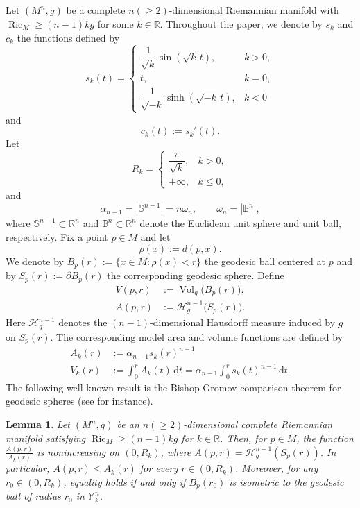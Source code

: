 \documentclass[11pt]{article}
\newtheorem{lemma}[theorem]{Lemma}
\newcommand{\Ric}{\operatorname{Ric}}
\newcommand{\Vol}{\operatorname{Vol}}
\newcommand{\dd}{\,\mathrm{d}}
\newcommand{\Sph}{\mathbb{S}}
\begin{document}
Let $(M^n,g)$ be a complete $n(\geq 2)$-dimensional Riemannian manifold with $\Ric_M\geq (n-1)kg$ for some $k\in\mathbb{R}$. Throughout the paper, we denote by $s_k$  and $c_k$ the functions defined by
\[
s_k(t)
=
\begin{cases}
\dfrac{1}{\sqrt{k}}\sin(\sqrt{k}\,t),
& k>0,\\[1.2ex]
t,
& k=0,\\[1.2ex]
\dfrac{1}{\sqrt{-k}}\sinh(\sqrt{-k}\,t),
& k<0
\end{cases}
\]
and
\[
c_k(t):=s_k'(t).
\]
Let
\[
R_k=
\begin{cases}
\dfrac{\pi}{\sqrt{k}},
& k>0,\\[1ex]
+\infty,
& k\leq0,
\end{cases}
\]
and
\[
\alpha_{n-1}
=
\left|\Sph^{n-1}\right|
=
n\omega_n,
\qquad
\omega_n
=
\left|\mathbb{B}^n\right|,
\]
where $\Sph^{n-1}\subset\mathbb{R}^n$ and $\mathbb{B}^n\subset\mathbb{R}^n$ denote the Euclidean unit sphere and unit ball, respectively. Fix a point $p\in M$ and let
\[
\rho(x):=d(p,x).
\]
We denote by $B_p(r):=\{x\in M:\rho(x)<r\}$ the geodesic ball centered at $p$ and by $S_p(r):=\partial B_p(r)$ the corresponding geodesic sphere. Define  
\begin{align*}
V(p,r)&:=\Vol_g\bigl(B_p(r)\bigr), \\
A(p,r)&:=\mathcal H_g^{n-1}\bigl(S_p(r)\bigr).
\end{align*}
Here $\mathcal H_g^{n-1}$ denotes the $(n-1)$-dimensional Hausdorff measure induced by $g$ on $S_p(r)$. The corresponding model area and volume functions are defined by
\begin{align*}
A_k(r) &:= \alpha_{n-1}s_k(r)^{n-1} \\
V_k(r) &:= \int_0^r A_k(t)\dd t = \alpha_{n-1}\int_0^r s_k(t)^{n-1}\dd t.
\end{align*}
The following well-known result is the Bishop-Gromov comparison theorem for geodesic spheres (see \cite{BishopCrittenden} for instance).

\begin{lemma} \label{lem:area-comparison}
Let \((M^n,g)\) be an $n(\geq 2)$-dimensional complete Riemannian manifold satisfying $\Ric_M\geq(n-1)kg$ for \(k\in\mathbb{R}\). Then, for $p\in M$, the function $\frac{A(p,r)}{A_k (r)}$ is nonincreasing on \((0,R_k)\), where $A(p,r)=\mathcal H_g^{n-1}(S_p(r))$. In particular, $A(p,r)\leq A_k(r)$ for every $r\in(0,R_k)$. Moreover, for any $r_0\in(0,R_k)$, equality holds if and only if $B_p(r_0)$ is isometric to the geodesic ball of radius $r_0$ in $\mathbb{M}_k^n$.
\end{lemma}
\end{document}
